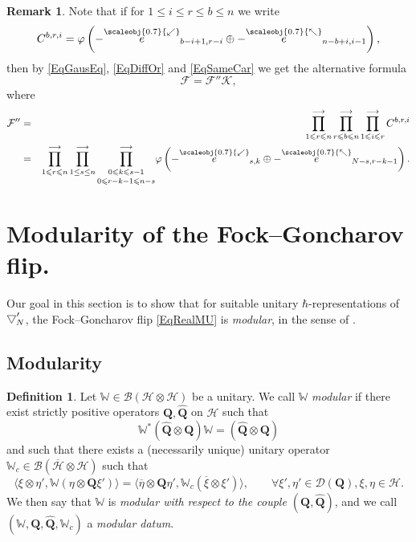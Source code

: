\documentclass[11pt, reqno]{amsart}
\theoremstyle{definition}
\newtheorem{defn}[theorem]{Definition}
\newtheorem{remark}[theorem]{Remark}
\numberwithin{equation}{section}
\def\longra{\longrightarrow}
\newcommand{\hr}[1]{\left(#1\right)}                                                    %
\def\le{\leqslant}
\def\msD{\mathscr D}
\def\Hc{\mathcal H}
\newcommand{\Bc}{\mathcal{B}}
\newcommand{\Qb}{\mathbf{Q}}
\newcommand{\Kc}{\mathcal{K}}
\newcommand{\Fct}{\mathcal{F}}
\newcommand{\Fctt}{\mathcal{F}''}
\newcommand{\nwars}{\scaleobj{0.7}{\nwarrow}}
\newcommand{\swars}{\scaleobj{0.7}{\swarrow}}
\newcommand{\nwe}{\overset{\nwars}{e}}
\newcommand{\swe}{\overset{\swars}{e}}
\newcommand{\wbtd}[1]{\raisebox{\depth}{$\bigtriangledown'$\!\!}_{#1}}
\newcommand{\Wbb}{\mathbb{W}}
\newcommand{\wWbb}{\mathbb{W}_c}
\begin{document}
\begin{remark}
Note that if for $1\leq i\leq r \leq b \leq n$ we write 
\begin{equation}\label{DefCbri}
C^{b,r,i} = \varphi\hr{-\swe_{b-i+1,r-i}\oplus -\nwe_{n-b+i,i-1}},
\end{equation}
then by \eqref{EqGausEq}, \eqref{EqDiffOr} and \eqref{EqSameCar} we get the alternative formula 
\begin{equation}\label{EqRealMUAlt}
\Fct = \Fctt\Kc,
\end{equation}
where 
\begin{eqnarray}
\Fctt &=&  \prod_{1 \le r \le n}^{\longra} \prod_{r \le b \le n}^{\longra} \prod_{1 \le i \le r}^{\longra} C^{b,r,i}\\
&=& \label{eq:Fprime-1or2} \prod_{1 \le r \le n}^{\longra} \prod_{1\leq s \leq n}^{\longra} \underset{0\le r-k-1\le n-s}{\prod_{0 \le k \le s-1}^{\longra}}\varphi\hr{-\swe_{s,k}\oplus -\nwe_{N-s,r-k-1}}.
\end{eqnarray}  
\end{remark}





\section{Modularity of the Fock--Goncharov flip.}


Our goal in this section is to show that for suitable unitary $\hbar$-representations of $\wbtd{N}$, the Fock--Goncharov flip \eqref{EqRealMU} is \emph{modular}, in the sense of \cite[Definition 2.1]{SW01}.

\subsection{Modularity}
\begin{defn}\label{DefModular}
Let $\Wbb \in \Bc(\Hc\otimes \Hc)$ be a  unitary. We call $\Wbb$ \emph{modular} if there exist strictly positive operators $\Qb,\hat{\Qb}$ on $\Hc$ such that 
\begin{equation}\label{EqCommModStruct}
\Wbb^*(\hat{\Qb}\otimes \Qb)\Wbb = (\hat{\Qb}\otimes \Qb)
\end{equation}
and such that there exists a (necessarily unique) unitary operator $\wWbb \in \Bc(\overline{\Hc}\otimes \Hc)$ 
such that 
\begin{equation}\label{EqRightInvOp}
\langle \xi\otimes \eta',\Wbb(\eta\otimes \Qb\xi')\rangle = \langle \overline{\eta}\otimes \Qb\eta',\wWbb(\overline{\xi} \otimes \xi')\rangle,\qquad \forall \xi',\eta'\in \msD(\Qb),\xi,\eta\in \Hc.
\end{equation}
We then say that $\Wbb$ is \emph{modular with respect to the couple $(\Qb,\hat{\Qb})$}, and we call $(\Wbb,\Qb,\hat{\Qb},\wWbb)$ a \emph{modular datum}.
\end{defn}
\end{document}
